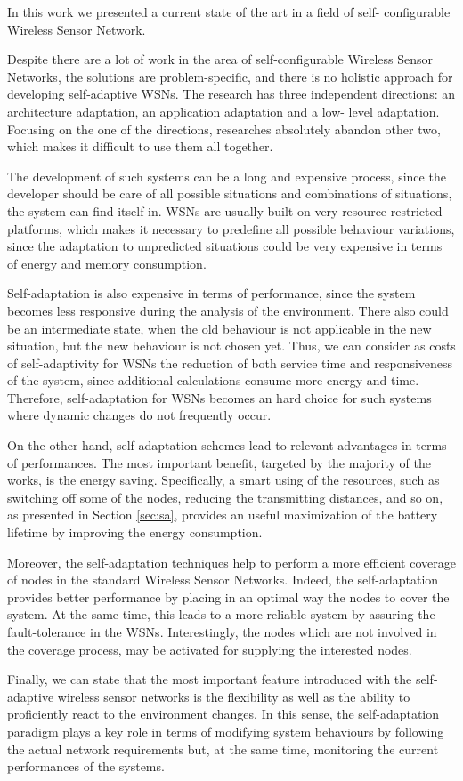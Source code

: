 In this work we presented a current state of the art in a field of self-
configurable Wireless Sensor Network. 

Despite there are a lot of work in the area of self-configurable Wireless
Sensor Networks, the solutions are problem-specific, and there is no holistic
approach for developing self-adaptive WSNs. The research has three independent
directions: an architecture adaptation, an application adaptation and a low-
level adaptation. Focusing on the one of the directions, researches absolutely
abandon other two, which makes it difficult to use them all together.

The development of such systems can be a long and expensive process, since
the developer should be care of all possible situations and combinations of
situations, the system can find itself in. WSNs are usually built on very
resource-restricted platforms, which makes it necessary to predefine all
possible behaviour variations, since the adaptation to unpredicted situations
could be very expensive in terms of energy and memory consumption.

Self-adaptation is also expensive in terms of performance, since the system
becomes less responsive during the analysis of the environment. There also could
be an intermediate state, when the old behaviour is not applicable in the new
situation, but the new behaviour is not chosen yet. Thus, we can consider as costs of self-adaptivity for WSNs the reduction of both service time and responsiveness of the system, since additional calculations consume more energy and time. Therefore, self-adaptation for WSNs becomes an hard choice for such systems where dynamic changes do not frequently occur. 

On the other hand, self-adaptation schemes lead to relevant advantages in terms of performances. The most important benefit, targeted by the majority of the works, is the energy saving. Specifically, a smart using of the resources, such as switching off some of the nodes, reducing the transmitting distances, and so on, as presented in Section \ref{sec:sa}, provides an useful maximization of the battery lifetime by improving the energy consumption. 

Moreover, the self-adaptation techniques help to perform a more efficient coverage of nodes in the standard Wireless Sensor Networks. Indeed, the self-adaptation provides better performance by placing in an optimal way the nodes to cover the system. At the same time, this leads to a more reliable system by assuring the fault-tolerance in the WSNs. Interestingly, the nodes which are not involved in the coverage process, may be activated for supplying the interested nodes.

Finally, we can state that the most important feature introduced with the self-adaptive wireless sensor networks is the flexibility as well as the ability to proficiently react to the environment changes. In this sense, the self-adaptation paradigm plays a key role in terms of modifying system behaviours by following the actual network requirements but, at the same time, monitoring the current performances of the systems.


